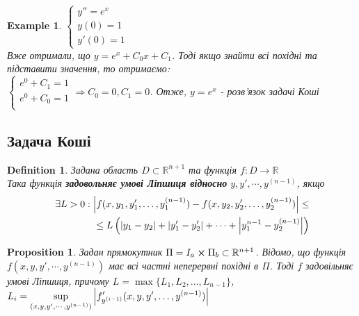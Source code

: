 \documentclass[a4paper, 10pt]{article}
\theoremstyle{theoremdd}
\theoremstyle{theoremdd}
\newtheorem{definition}[theorem]{Definition}
\theoremstyle{theoremdd}
\theoremstyle{theoremdd}
\newtheorem{example}[theorem]{Example}
\theoremstyle{theoremdd}
\newtheorem{proposition}[theorem]{Proposition}
\theoremstyle{theoremdd}
\theoremstyle{theoremdd}
\theoremstyle{theoremdd}
\begin{document}
	\begin{example}
 	$\begin{cases}
	y'' = e^x\\
	y(0) = 1\\
	y'(0) = 1
	\end{cases}$\\
	Вже отримали, що $y = e^x + C_0 x + C_1$. Тоді якщо знайти всі похідні та підставити значення, то отримаємо:\\
	$\begin{cases}
	e^0 + C_1 = 1\\
	e^0 + C_0 = 1\\
	\end{cases} \Rightarrow C_0 = 0, C_1 = 0
	$. Отже, $y=e^x$ - розв'язок задачі Коші
	\end{example}
	
	\subsection{Задача Коші}
	\begin{definition}
 Задана область $D \subset \mathbb{R}^{n+1}$ та функція $f: D \rightarrow 	\mathbb{R}$\\
	Така функція \textbf{задовольняє умові Ліпшиця відносно} $y,y',\cdots,y^{(n-1)}$, якщо
	\begin{align*}
	\exists L>0: \abs{f(x,y_1, y'_1,\dots, y^{(n-1)}_1) - f(x,y_2, y'_2,\dots, y^{(n-1)}_2)} \leq \\ \leq L\left(\abs{y_1-y_2}+\abs{y'_1-y'_2}+\dots+\abs{y^{n-1}_1-y^{(n-1)}_2}\right)
	\end{align*}	
	\end{definition}
	\begin{proposition}
 Задан прямокутник $\Pi = I_a \cross \Pi_b \subset \mathbb{R}^{n+1}$. Відомо, що функція $f(x,y,y',\cdots,y^{(n-1)})$ має всі частні неперервні похідні в $\Pi$. Тоді $f$ задовільняє умові Ліпшиця, причому $L=\max\{L_1,L_2, \dots, L_{n-1}\}$, $\displaystyle L_i = \sup_{(x,y,y',\cdots,y^{(n-1)})} \abs{f'_{y^{(i-1)}} (x,y,y',\dots,y^{(n-1)})}$
	\end{proposition}
\end{document}
